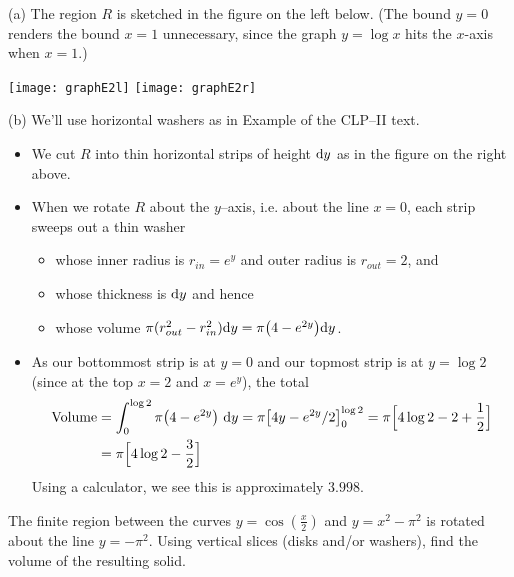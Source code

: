 \begin{solution} (a)
The region $R$ is sketched in the figure on the left below. (The bound $y=0$ renders the bound $x=1$ unnecessary, since the graph $y=\log x$ hits the $x$-axis when $x=1$.)

\begin{center}
       \texttt{[image: graphE2l]}\qquad
       \texttt{[image: graphE2r]}
\end{center}

\noindent (b)
We'll use horizontal washers as in Example  
of the %
CLP--II text.
 \begin{itemize}
\item We cut $R$ into thin horizontal  strips of height $\mathrm{d}y$ as in
the figure on the right above.

\item When we rotate $R$ about the $y$--axis, i.e. about the line $x=0$,
each strip sweeps out a thin washer
\begin{itemize}
\item whose inner radius is $r_{in}= e^y$ and outer radius is $r_{out}=2$, and
\item whose thickness is $\mathrm{d}y$ and hence
\item whose volume $\pi(r_{out}^2 - r_{in}^2)\mathrm{d}y = \pi\big(4-e^{2y}\big)\mathrm{d}y$.
\end{itemize}
\item As our bottommost strip is at $y=0$ and our topmost
strip is at $y=\log 2$ (since at the top $x=2$ and $x=e^y$), the total
\begin{align*}
\text{Volume}
&= \int _0^{\log 2} \pi\big(4-e^{2y}\big)\ \mathrm{d}y
=\pi\big[4y -e^{2y}/2\big]_0^{\log 2}
=\pi\Big[4\log 2 - 2 +\frac{1}{2}\Big] \\
&=\pi\Big[4\log 2 - \frac{3}{2}\Big]
\end{align*}
Using a calculator, we see this is approximately $3.998$.
\end{itemize}
\end{solution}

\begin{question}[2016Q3] %
The finite region between the curves $y = \cos(\frac x2)$
and $y = x^2 - \pi^2$ is rotated about the line $y=-{\pi^2}$.
Using vertical slices (disks and/or washers), find the volume of
the resulting solid.
\end{question}

